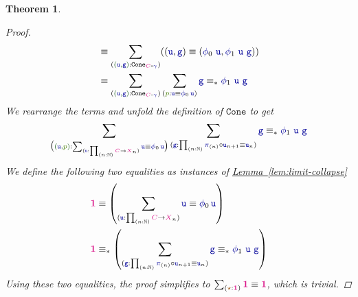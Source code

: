 \documentclass[twoside,11pt,openright]{report}
\theoremstyle{plain} %
\newtheorem{thm}{Theorem}[section]
\theoremstyle{definition}
\theoremstyle{remark}
\newcommand*{\lemref}[1]{\hyperref[lem:#1]{Lemma~\ref*{lem:#1}}}
\newcommand*{\term}[1]{\textcolor{green!30!black}{#1}} %
\newcommand*{\pathterm}[1]{\textcolor{green!65!red!75!black}{#1}}
\newcommand*{\type}[1]{\textcolor{magenta!90!black}{#1}}
\newcommand*{\unit}{\type{\textbf{1}}}
\newcommand*{\coalg}[2]{#1\texttt{-}#2}
\newcommand*{\constant}[1]{\textcolor{orange!60!black}{\ensuremath{\mathtt{#1}}}}
\newcommand*{\function}[1]{\textcolor{blue!60!black}{\ensuremath{\mathtt{#1}}}}
\newcommand*{\typeformer}[1]{\ensuremath{\mathtt{#1}}}
\newcommand*{\unitelem}{\constant{\star}} %
\begin{document}
\begin{thm}
\begin{proof}
\begin{align}
    &\equiv \sum_{(\term{(\function{u},\function{g})} : \typeformer{Cone}_{\coalg{\type{C}}{\function{\gamma}}})} ((\function{u},\function{g}) \equiv (\function{\phi}_0~\function{u},\function{\phi}_1~\function{u}~\function{g})) \\
    &\equiv \sum_{(\term{(\function{u},\function{g})} : \typeformer{Cone}_{\coalg{\type{C}}{\function{\gamma}}})} \sum_{(\pathterm{p} : \function{u} \equiv \function{\phi}_0\,\function{u})} \function{g} \equiv_{*} \function{\phi}_1~\function{u}~\function{g}
  \end{align}
  We rearrange the terms and unfold the definition of \(\typeformer{Cone}\) to get
  \begin{equation}
    \sum_{\big(\term{(\function{u},\pathterm{p})} : \sum_{(\function{u} : \prod_{(n:\mathbb{N})} \type{C} \rightarrow \type{X}_n)} \function{u} \equiv \function{\phi}_0\,\function{u}\big)} \sum_{(\function{g} : \prod_{(n:\mathbb{N})} \function{\pi}_{(n)} \circ \function{u}_{n+1} \equiv \function{u}_n)}\function{g} \equiv_{*} \function{\phi}_1~\function{u}~\function{g}
  \end{equation}
  We define the following two equalities as instances of \lemref{limit-collapse}
  \begin{align}
    \unit &\equiv \left(\sum_{(\function{u} : \prod_{(n:\mathbb{N})} \type{C} \rightarrow \type{X}_n)} \function{u} \equiv \function{\phi}_0\,\function{u}\right)  \\
    \unit &\equiv_{*} \left(\sum_{(\function{g} : \prod_{(n:\mathbb{N})} \function{\pi}_{(n)} \circ \function{u}_{n+1} \equiv \function{u}_n)}\function{g} \equiv_{*} \function{\phi}_1~\function{u}~\function{g}\right)
  \end{align}
  Using these two equalities, the proof simplifies to \(\sum_{(\unitelem : \unit)} \unit \equiv \unit\), which is trivial.
  \end{proof}
\end{thm}
\end{document}
